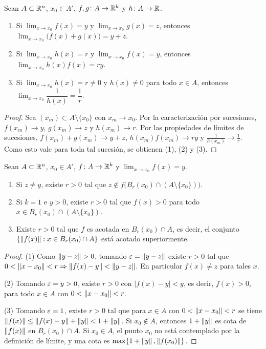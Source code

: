 \begin{prop}
  Sean \(A \subset \mathbb{R}^n\), \(x_0 \in A'\), \(f, g\colon A \to \mathbb{R}^k\) y \(h\colon A \to \mathbb{R}\).
  \begin{enumerate}[label=(\arabic*)]
    \item Si \(\lim_{x \to x_0} f(x) = y\) y \(\lim_{x \to x_0} g(x) = z\), entonces \(\lim_{x \to x_0} \bigl( f(x) + g(x) \bigr) = y + z\).
    \item Si \(\lim_{x \to x_0} h(x) = r\) y \(\lim_{x \to x_0} f(x) = y\), entonces \(\lim_{x \to x_0} h(x) f(x) = r y\).
    \item Si \(\lim_{x \to x_0} h(x) = r \neq 0\) y \(h(x) \neq 0\) para todo \(x \in A\), entonces \(\lim_{x \to x_0} \dfrac{1}{h(x)} = \dfrac{1}{r}\).
  \end{enumerate}
\end{prop}

\begin{proof}
  Sea \({(x_m)} \subset A \setminus \{x_0\}\) con \(x_m \to x_0\). Por la caracterización por sucesiones, \(f(x_m) \to y\), \(g(x_m) \to z\) y \(h(x_m) \to r\). Por las propiedades de límites de sucesiones, \(f(x_m) + g(x_m) \to y + z\), \(h(x_m) f(x_m) \to r y\) y \(\frac{1}{h(x_m)} \to \frac{1}{r}\). Como esto vale para toda tal sucesión, se obtienen (1), (2) y (3).
\end{proof}

\begin{prop}
  Sean \(A \subset \mathbb{R}^n\), \(x_0 \in A'\), \(f\colon A \to \mathbb{R}^k\) y \(\lim_{x \to x_0} f(x) = y\).
  \begin{enumerate}[label=(\arabic*)]
    \item Si \(z \neq y\), existe \(r > 0\) tal que \(z \notin f\bigl( B_r(x_0) \cap (A \setminus \{x_0\}) \bigr)\).
    \item Si \(k = 1\) e \(y > 0\), existe \(r > 0\) tal que \(f(x) > 0\) para todo \(x \in B_r(x_0) \cap (A \setminus \{x_0\})\).
    \item Existe \(r > 0\) tal que \(f\) es acotada en \(B_r(x_0) \cap A\), es decir, el conjunto \(\{ \left\lVert f(x) \right\rVert : x \in B_r(x_0) \cap A \}\) está acotado superiormente.
  \end{enumerate}
\end{prop}

\begin{proof}
  (1) Como \(\left\lVert y - z \right\rVert > 0\), tomando \(\varepsilon = \left\lVert y - z \right\rVert\) existe \(r > 0\) tal que \(0 < \left\lVert x - x_0 \right\rVert < r \Rightarrow \left\lVert f(x) - y \right\rVert < \left\lVert y - z \right\rVert\). En particular \(f(x) \neq z\) para tales \(x\).

  (2) Tomando \(\varepsilon = y > 0\), existe \(r > 0\) con \(|f(x) - y| < y\), es decir, \(f(x) > 0\), para todo \(x \in A\) con \(0 < \left\lVert x - x_0 \right\rVert < r\).

  (3) Tomando \(\varepsilon = 1\), existe \(r > 0\) tal que para \(x \in A\) con \(0 < \left\lVert x - x_0 \right\rVert < r\) se tiene \(\left\lVert f(x) \right\rVert \leq \left\lVert f(x) - y \right\rVert + \left\lVert y \right\rVert < 1 + \left\lVert y \right\rVert\). Si \(x_0 \notin A\), entonces \(1 + \left\lVert y \right\rVert\) es cota de \(\left\lVert f(x) \right\rVert\) en \(B_r(x_0) \cap A\). Si \(x_0 \in A\), el punto \(x_0\) no está contemplado por la definición de límite, y una cota es \(\max\{ 1 + \left\lVert y \right\rVert, \left\lVert f(x_0) \right\rVert \}\).
\end{proof}

